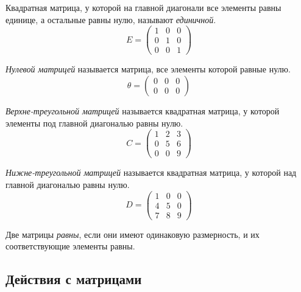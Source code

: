 \begin{definition}
  Квадратная матрица, у которой на главной диагонали все элементы равны единице, а остальные равны нулю, называют \textit{единичной}. \[
  E = \begin{pmatrix}
    1 & 0 & 0 \\
    0 & 1 & 0 \\
    0 & 0 & 1
  \end{pmatrix}
  \] 
\end{definition}

\begin{definition}
  \textit{Нулевой матрицей} называется матрица, все элементы которой равные нулю. \[
  \theta = \begin{pmatrix}
    0 & 0 & 0 \\
    0 & 0 & 0
  \end{pmatrix}
  \] 
\end{definition}

\begin{definition}
  \textit{Верхне-треугольной матрицей} называется квадратная матрица, у которой элементы под главной диагональю равны нулю. \[
  C = \begin{pmatrix}
    1 & 2 & 3 \\
    0 & 5 & 6 \\
    0 & 0 & 9
  \end{pmatrix}
  \] 
\end{definition}

\begin{definition}
  \textit{Нижне-треугольной матрицей} называется квадратная матрица, у которой над главной диагональю равны нулю. \[
  D = \begin{pmatrix}
    1 & 0 & 0 \\
    4 & 5 & 0 \\
    7 & 8 & 9
  \end{pmatrix}
  \] 
\end{definition}

Две матрицы \textit{равны}, если они имеют одинаковую размерность, и их соответствующие элементы равны. 

\subsection{Действия с матрицами}

